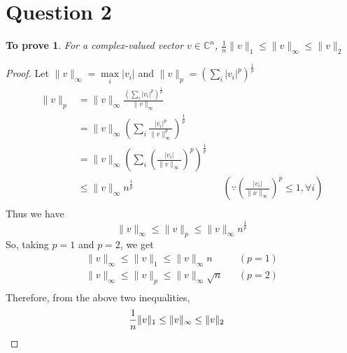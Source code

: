 \documentclass[11pt, oneside]{article}
\newtheorem*{remark}{To prove}
\begin{document}
\section*{Question 2}
  \begin{remark}
    For a complex-valued vector $v \in \mathbb{C}^n$, $\frac{1}{n}\|v\|_1 \leq \|v\|_{\infty} \leq \|v\|_2$
  \end{remark}
  \begin{proof}
    Let $\|v\|_{\infty} = \max\limits_i |v_i|$ and $\|v\|_p = \left(\sum\limits_i |v_i|^p \right)^{\frac{1}{p}}$
    \begin{align*}
      \|v\|_p &= \|v\|_{\infty} \frac{\left(\sum_i |v_i|^p\right)^{\frac{1}{p}}}{\|v\|_{\infty}} \\
              &= \|v\|_{\infty} \left(\sum_i\frac{|v_i|^p}{\|v\|_{\infty}^p}\right)^{\frac{1}{p}} \\
              &= \|v\|_{\infty} \left(\sum_i \left(\frac{|v_i|}{\|v\|_{\infty}}\right)^{p}\right)^{\frac{1}{p}} \\
              &\leq \|v\|_{\infty} n^{\frac{1}{p}} && \left(\because \left(\frac{|v_i|}{\|x\|_{\infty}}\right)^p \leq 1, \forall i\right) \\
    \end{align*}
    Thus we have
    \begin{equation*}
      \|v\|_{\infty} \leq \|v\|_{p} \leq \|v\|_{\infty} n^{\frac{1}{p}}
    \end{equation*}
    So, taking $p=1$ and $p=2$, we get
    \begin{align*}
      \|v\|_{\infty} \leq \|v\|_{1} \leq \|v\|_{\infty} n && (p=1)\\
      \|v\|_{\infty} \leq \|v\|_{p} \leq \|v\|_{\infty} \sqrt{n} && (p=2)\\
    \end{align*}
    Therefore, from the above two inequalities,
    \begin{align*}
      \frac{1}{n}\|v\|_1 \leq \|v\|_{\infty} \leq \|v\|_2 && \qedhere
    \end{align*}
  \end{proof}
\end{document}
